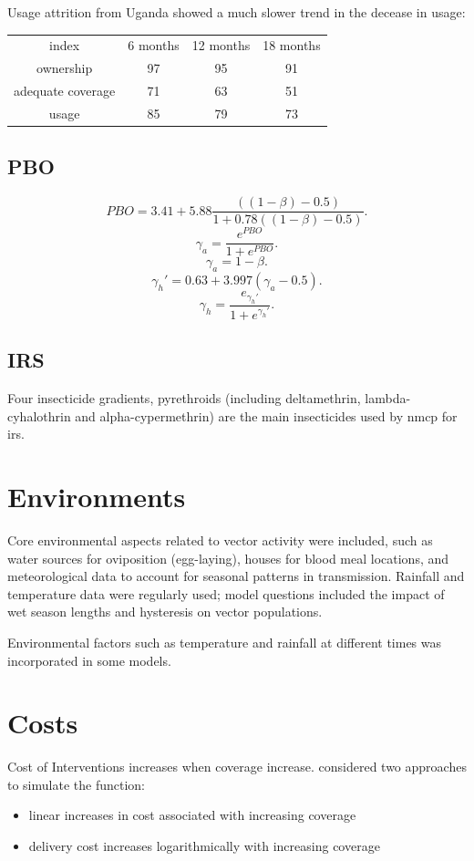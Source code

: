 \documentclass[a4paper, 12pt, twoside]{article}
\begin{document}
Usage attrition from Uganda\cite{Staedke2020} showed a much slower trend in the decease in usage:

\begin{center}
	\begin{tabular}{c c c c}
		index             & 6 months & 12 months & 18 months \\
		ownership         & 97       & 95        & 91        \\
		adequate coverage & 71       & 63        & 51        \\
		usage             & 85       & 79        & 73
	\end{tabular}
\end{center}

\subsection{PBO}

\[
	PBO = 3.41 + 5.88 \frac{((1-\beta) - 0.5)}{1 + 0.78 ((1-\beta) - 0.5)}
	.\]
\[
	\gamma_a = \frac{e^{PBO}}{1 + e^{PBO}}
	.\]
\[
	\gamma_a = 1 - \beta
	.\]
\[
	\gamma_h' = 0.63 + 3.997 ( \gamma_a - 0.5 )
	.\]
\[
	\gamma_h = \frac{e_{\gamma_h'}}{1+e^{\gamma_h'}}
	.\]

\subsection{IRS}
Four insecticide gradients, pyrethroids (including deltamethrin, lambda-cyhalothrin and alpha-cypermethrin) are the main insecticides used by \gls{nmcp} for \gls{irs}.

\section{Environments}%
\label{sec:environments}
Core environmental aspects related to vector activity were included, such as water sources for oviposition (egg-laying)\cite{Bomblies2008}, houses for blood meal locations\cite{Gu2009a}, and meteorological data to account for seasonal patterns in transmission\cite{Depinay2004}.
Rainfall and temperature data were regularly used; model questions included the impact of wet season lengths\cite{Endo2016a} and hysteresis\cite{Yamana2017} on vector populations.

Environmental factors such as temperature and rainfall at different times was incorporated in some models.


\section{Costs}
Cost of Interventions increases when coverage increase.\cite{Winskill2017a} considered two approaches to simulate the function:
\begin{itemize}
	\item linear increases in cost associated with increasing coverage
	\item delivery cost increases logarithmically with increasing coverage
\end{itemize}
\end{document}
